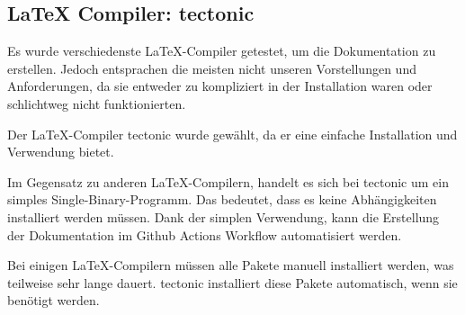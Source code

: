\subsection{LaTeX Compiler: tectonic}

Es wurde verschiedenste LaTeX-Compiler getestet, um die Dokumentation zu erstellen. Jedoch entsprachen die meisten nicht unseren Vorstellungen und Anforderungen, da sie entweder zu kompliziert in der Installation waren oder schlichtweg nicht funktionierten.
\newline


Der LaTeX-Compiler tectonic wurde gewählt, da er eine einfache Installation und Verwendung bietet.
\newline

Im Gegensatz zu anderen LaTeX-Compilern, handelt es sich bei tectonic um ein simples Single-Binary-Programm. Das bedeutet, dass es keine Abhängigkeiten installiert werden müssen. Dank der simplen Verwendung, kann die Erstellung der Dokumentation im Github Actions Workflow automatisiert werden.
\newline

Bei einigen LaTeX-Compilern müssen alle Pakete manuell installiert werden, was teilweise sehr lange dauert. tectonic installiert diese Pakete automatisch, wenn sie benötigt werden.

\newpage

